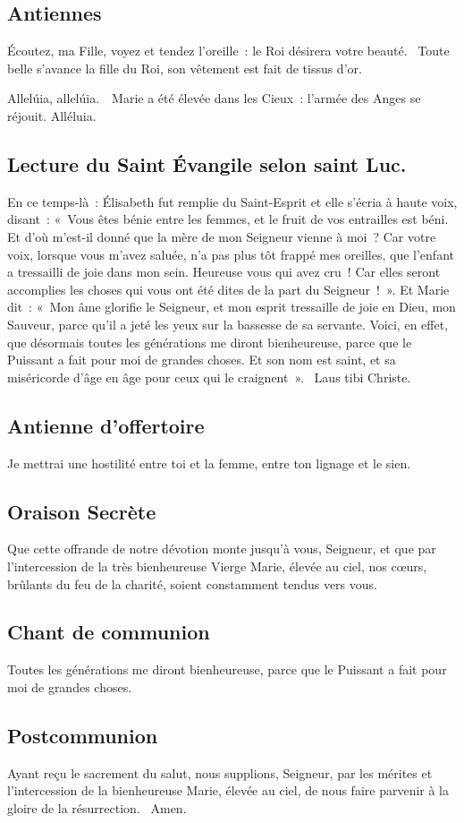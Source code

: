 \begin{multicols}{2}
\subsection*{Antiennes}
Écoutez, ma Fille, voyez et tendez l’oreille : le Roi désirera votre beauté. \vb Toute belle s’avance la fille du Roi, son vêtement est fait de tissus d’or.

Allelúia, allelúia. \vb\ Marie a été élevée dans les Cieux : l’armée des Anges se réjouit. Alléluia.


\subsection*{Lecture du Saint Évangile selon saint Luc.}
En ce temps-là : Élisabeth fut remplie du Saint-Esprit et elle s’écria à haute voix, disant : « Vous êtes bénie entre les femmes, et le fruit de vos entrailles est béni. Et d’où m’est-il donné que la mère de mon Seigneur vienne à moi ? Car votre voix, lorsque vous m’avez saluée, n’a pas plus tôt frappé mes oreilles, que l’enfant a tressailli de joie dans mon sein. Heureuse vous qui avez cru ! Car elles seront accomplies les choses qui vous ont été dites de la part du Seigneur ! ». Et Marie dit : « Mon âme glorifie le Seigneur, et mon esprit tressaille de joie en Dieu, mon Sauveur, parce qu’il a jeté les yeux sur la bassesse de sa servante. Voici, en effet, que désormais toutes les générations me diront bienheureuse, parce que le Puissant a fait pour moi de grandes choses. Et son nom est saint, et sa miséricorde d’âge en âge pour ceux qui le craignent ».
{\textbf \rb\ Laus tibi Christe.}

\subsection*{Antienne d'offertoire}
Je mettrai une hostilité entre toi et la femme, entre ton lignage et le sien.

\subsection*{Oraison Secrète}
Que cette offrande de notre dévotion monte jusqu’à vous, Seigneur, et que par l’intercession de la très bienheureuse Vierge Marie, élevée au ciel, nos cœurs, brûlants du feu de la charité, soient constamment tendus vers vous.

\subsection*{Chant de communion}
Toutes les générations me diront bienheureuse, parce que le Puissant a fait pour moi de grandes choses.

\subsection*{Postcommunion}
Ayant reçu le sacrement du salut, nous supplions, Seigneur, par les mérites et l’intercession de la bienheureuse Marie, élevée au ciel, de nous faire parvenir à la gloire de la résurrection.
{\textbf \rb\ Amen.}
\end{multicols}